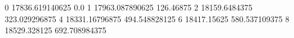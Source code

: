0 17836.619140625 0.0
1 17963.087890625 126.46875
2 18159.6484375 323.029296875
4 18331.16796875 494.548828125
6 18417.15625 580.537109375
8 18529.328125 692.708984375
